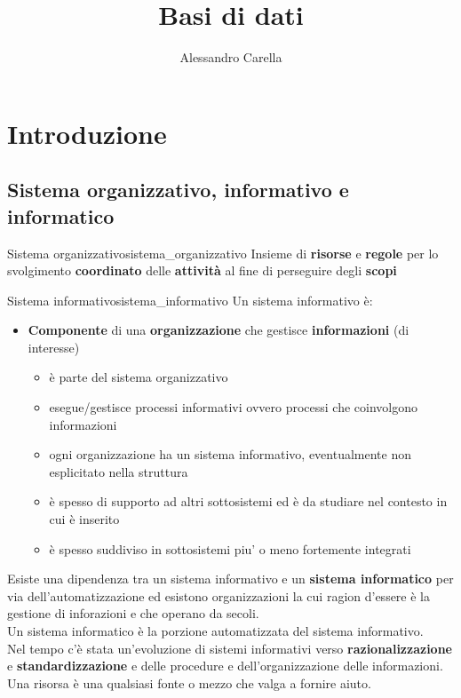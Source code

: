 \documentclass[12pt]{report}
\date{}
\author{Alessandro Carella}
\title{Basi di dati}
\newcounter{definition}
\newcommand{\nmu}{}
\begin{document}
	{
		\let\cleardoublepage\clearpage
		\maketitle
		\tableofcontents
	}
	\chapter{Introduzione}
	\section{Sistema organizzativo, informativo e informatico}
	\begin{definition}{\nmu Sistema organizzativo}{sistema_organizzativo}
		Insieme di \textbf{risorse} e \textbf{regole} per lo svolgimento \textbf{coordinato} delle \textbf{attività} al fine di perseguire degli \textbf{scopi}
	\end{definition}
	\begin{definition}{\nmu Sistema informativo}{sistema_informativo}
		Un sistema informativo è:
		\begin{itemize}
			\item \textbf{Componente} di una \textbf{organizzazione} che gestisce \textbf{informazioni} (di interesse)
			\begin{itemize}
				\item è parte del sistema organizzativo
				\item esegue/gestisce processi informativi ovvero processi che coinvolgono informazioni
				\item ogni organizzazione ha un sistema informativo, eventualmente non esplicitato nella struttura
				\item è spesso di supporto ad altri sottosistemi ed è da studiare nel contesto in cui è inserito
				\item è spesso suddiviso in sottosistemi piu' o meno fortemente integrati
			\end{itemize}
		\end{itemize}
		\end{definition}
		Esiste una dipendenza tra un sistema informativo e un \textbf{sistema informatico} per via dell'automatizzazione ed esistono organizzazioni la cui ragion d'essere è la gestione di inforazioni e che operano da secoli. \\
		Un sistema informatico è la porzione automatizzata del sistema informativo. \\
		Nel tempo c'è stata un'evoluzione di sistemi informativi verso \textbf{razionalizzazione} e \textbf{standardizzazione} e delle procedure e dell'organizzazione delle informazioni. \\
		Una risorsa è una qualsiasi fonte o mezzo che valga a fornire aiuto. \\
\end{document}

